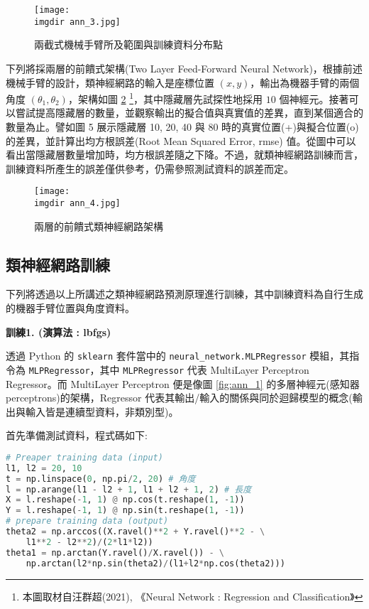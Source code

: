 \begin{figure}[H]
    \centering
        \texttt{[image: \\imgdir ann\_3.jpg]}
    \caption{兩截式機械手臂所及範圍與訓練資料分布點}
    \label{fig:ann_3}
\end{figure}

下列將採兩層的前饋式架構(Two Layer Feed-Forward Neural Network)，根據前述機械手臂的設計，類神經網路的輸入是座標位置 $(x, y)$，輸出為機器手臂的兩個角度 $(\theta_1, \theta_2)$，架構如圖 \ref{fig:ann_4} \footnote{本圖取材自汪群超(2021), 《Neural Network : Regression and Classification》}，其中隱藏層先試探性地採用 $10$ 個神經元。接著可以嘗試提高隱藏層的數量，並觀察輸出的擬合值與真實值的差異，直到某個適合的數量為止。譬如圖 5 展示隱藏層 10, 20, 40 與 80 時的真實位置(+)與擬合位置(o)的差異，並計算出均方根誤差(Root Mean Squared Error, rmse) 值。從圖中可以看出當隱藏層數量增加時，均方根誤差隨之下降。不過，就類神經網路訓練而言，訓練資料所產生的誤差僅供參考，仍需參照測試資料的誤差而定。

\begin{figure}[H]
    \centering
        \texttt{[image: \\imgdir ann\_4.jpg]}
    \caption{兩層的前饋式類神經網路架構}
    \label{fig:ann_4}
\end{figure}

\subsection{類神經網路訓練}
下列將透過以上所講述之類神經網路預測原理進行訓練，其中訓練資料為自行生成的機器手臂位置與角度資料。

\textbf{\large 訓練1. (演算法 : lbfgs)} 

透過 Python 的 \verb|sklearn| 套件當中的 \verb|neural_network.MLPRegressor| 模組，其指令為 \verb|MLPRegressor|，其中 \verb|MLPRegressor| 代表 MultiLayer Perceptron Regressor。而 MultiLayer Perceptron 便是像圖 \ref{fig:ann_1} 的多層神經元(感知器 perceptrons)的架構，Regressor 代表其輸出/輸入的關係與同於迴歸模型的概念(輸出與輸入皆是連續型資料，非類別型)。

首先準備測試資料，程式碼如下:
\bigskip
\begin{lstlisting}[language = Python]
# Preaper training data (input)
l1, l2 = 20, 10
t = np.linspace(0, np.pi/2, 20) # 角度
l = np.arange(l1 - l2 + 1, l1 + l2 + 1, 2) # 長度 
X = l.reshape(-1, 1) @ np.cos(t.reshape(1, -1))
Y = l.reshape(-1, 1) @ np.sin(t.reshape(1, -1))
# prepare training data (output)
theta2 = np.arccos((X.ravel()**2 + Y.ravel()**2 - \
    l1**2 - l2**2)/(2*l1*l2))
theta1 = np.arctan(Y.ravel()/X.ravel()) - \
    np.arctan(l2*np.sin(theta2)/(l1+l2*np.cos(theta2)))
\end{lstlisting}

